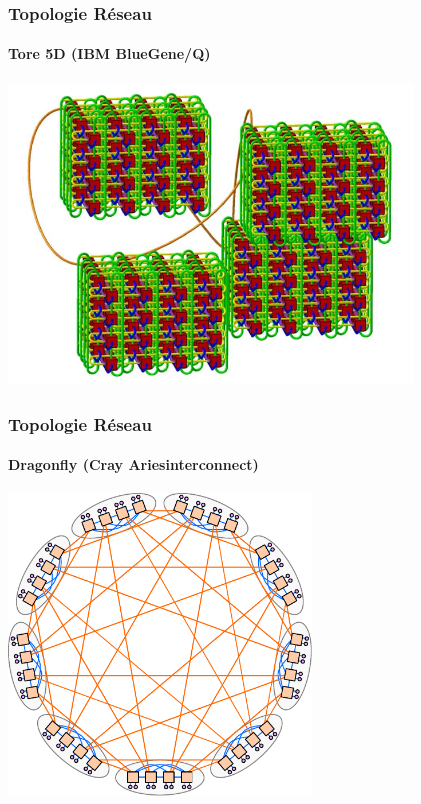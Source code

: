 \documentclass[xcolor={x11names,svgnames}]{beamer}
\begin{document}
\begin{frame}
  \frametitle{Topologie Réseau}
  \framesubtitle{Tore 5D (IBM BlueGene/Q)}

  \centering
  \includegraphics[height=8cm]{5D_torus.pdf}
\end{frame}

\begin{frame}
  \frametitle{Topologie Réseau}
  \framesubtitle{Dragonfly (Cray \og Aries\fg interconnect)}

  \centering
  \includegraphics[height=8cm]{dragonfly.pdf}
\end{frame}



\end{document}
